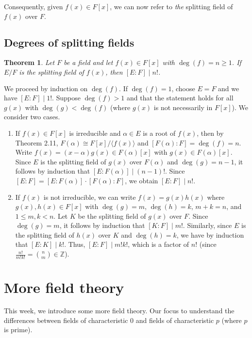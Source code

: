\documentclass[10pt]{article}
\makeatletter
\newcommand{\Z}{\mathbb{Z}}
\theoremstyle{newstyle}
\newtheorem{thm}{Theorem}[section]
\newenvironment{pf}[1][\proofname]{\par
  \pushQED{\qed}%
  \normalfont \topsep0\p@\relax
  \trivlist
  \item[\hskip\labelsep\scshape
  #1\@addpunct{.}]\ignorespaces
}{%
  \popQED\endtrivlist\@endpefalse
}
\makeatother
\begin{document}
Consequently, given $f(x) \in F[x]$, we can now refer to {\it the} splitting field of $f(x)$ over $F$. 

\subsection{Degrees of splitting fields}

\begin{thm}
Let $F$ be a field and let $f(x) \in F[x]$ with $\deg(f) = n \geq 1$. If $E/F$ is the 
splitting field of $f(x)$, then $[E : F] \mid n!$. 
\end{thm}
\begin{pf}
We proceed by induction on $\deg(f)$. If $\deg(f) = 1$, choose $E = F$ and we have 
$[E : F] \mid 1!$. Suppose $\deg(f) > 1$ and that the statement holds for all 
$g(x)$ with $\deg(g) < \deg(f)$ (where $g(x)$ is not necessarily in $F[x]$). 
We consider two cases. 
\begin{enumerate}[(1)]
    \item If $f(x) \in F[x]$ is irreducible and $\alpha \in E$ is a root of $f(x)$, then 
    by Theorem 2.11, $F(\alpha) \cong F[x]/\langle f(x) \rangle$ and $[F(\alpha) : F] = \deg(f) = n$. 
    Write $f(x) = (x-\alpha)g(x) \in F(\alpha)[x]$ with $g(x) \in F(\alpha)[x]$. Since $E$ is the 
    splitting field of $g(x)$ over $F(\alpha)$ and $\deg(g) = n-1$, it follows by induction that 
    $[E : F(\alpha)] \mid (n-1)!$. Since $[E : F] = [E : F(\alpha)] \cdot [F(\alpha) : F]$, 
    we obtain $[E : F] \mid n!$. 
    \item If $f(x)$ is not irreducible, we can write $f(x) = g(x)h(x)$ where $g(x), h(x) \in F[x]$ 
    with $\deg(g) = m$, $\deg(h) = k$, $m + k = n$, and $1 \leq m, k < n$. Let $K$ be the 
    splitting field of $g(x)$ over $F$. Since $\deg(g) = m$, it follows by 
    induction that $[K : F] \mid m!$. Similarly, since $E$ is the splitting field of $h(x)$ 
    over $K$ and $\deg(h) = k$, we have by induction that $[E : K] \mid k!$. Thus, 
    $[E : F] \mid m!k!$, which is a factor of $n!$ (since $\frac{n!}{m!k!} = \binom{n}{m} \in \Z$).
    \qedhere
\end{enumerate}
\end{pf}

\newpage 
\section{More field theory}

This week, we introduce some more field theory. Our focus to understand the differences between 
fields of characteristic $0$ and fields of characteristic $p$ (where $p$ is prime).
\end{document}
